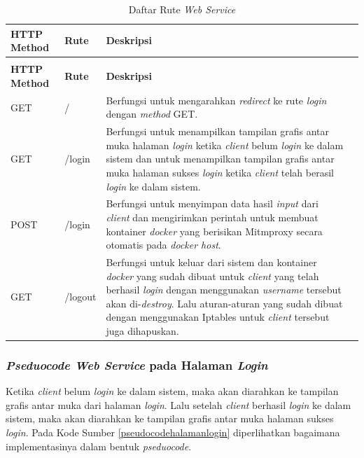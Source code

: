 \begin{longtable}{|p{}|p{}|p{}|p{}|} %
	
	\caption{Daftar Rute \textit{Web Service}} \label{tabelRuteWebServiceHalamnLogin} \\
	\hline
	\textbf{HTTP Method} & \textbf{Rute} & \textbf{Deskripsi} \\ \hline
	
	\endfirsthead
	\caption[]{Daftar Rute \textit{Web Service}}  \\
	\hline
	\textbf{HTTP Method} & \textbf{Rute} & \textbf{Deskripsi}  \\ \hline
	
	\endhead
	\endfoot
	\endlastfoot
	
	GET & / & Berfungsi untuk mengarahkan \textit{redirect} ke rute \textit{login} dengan \textit{method} GET.\\ \hline
	GET & /login & Berfungsi untuk menampilkan tampilan grafis antar muka halaman \textit{login} ketika \textit{client} belum \textit{login} ke dalam sistem dan untuk menampilkan tampilan grafis antar muka halaman sukses \textit{login} ketika \textit{client} telah berasil \textit{login} ke dalam sistem.\\ \hline
	POST & /login & Berfungsi untuk menyimpan data hasil \textit{input} dari \textit{client} dan mengirimkan perintah untuk membuat kontainer \textit{docker} yang berisikan Mitmproxy secara otomatis pada \textit{docker host}.\\ \hline
	GET & /logout & Berfungsi untuk keluar dari sistem dan kontainer \textit{docker} yang sudah dibuat untuk \textit{client} yang telah berhasil \textit{login} dengan menggunakan \textit{username} tersebut akan di-\textit{destroy}. Lalu aturan-aturan yang sudah dibuat dengan menggunakan Iptables untuk \textit{client} tersebut juga dihapuskan.\\ \hline
	
\end{longtable}

\subsubsection{\textit{Pseduocode Web Service} pada Halaman \textit{Login}}
Ketika \textit{client} belum \textit{login} ke dalam sistem, maka akan diarahkan ke tampilan grafis antar muka dari halaman \textit{login}. Lalu setelah \textit{client} berhasil \textit{login} ke dalam sistem, maka akan diarahkan ke tampilan grafis antar muka halaman sukses \textit{login}. Pada Kode Sumber \ref{pseudocodehalamanlogin} diperlihatkan bagaimana implementasinya dalam bentuk \textit{pseduocode}.
\newline
\newline
\newline
\newline
\newline
\newline
\newline
\newline
\newline

